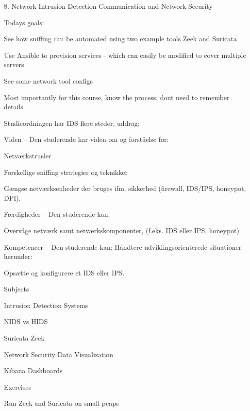 \documentclass[Screen16to9,17pt]{foils}
\begin{document}
\mytitlepage
{8. Network Intrusion Detection}
{Communication and Network Security \the\year}



Todays goals:
\begin{list2}
\item See how sniffing can be automated using two example tools Zeek and Suricata
\item Use Ansible to provision services - which can easily be modified to cover multiple servers
\item See some network tool configs
\item Most importantly for this course, know the process, dont need to remember details
\end{list2}


Studieordningen har IDS flere steder, uddrag:
\begin{list1}
\item Viden -- Den studerende har viden om og forståelse for:
\begin{list2}
\item Netværkstrusler
\item Forskellige sniffing strategier og teknikker
\item Gængse netværksenheder der bruges ifm. sikkerhed (firewall, IDS/IPS, honeypot,
DPI).
\end{list2}
\vskip 5mm
\item Færdigheder -- Den studerende kan:
\begin{list2}
\item Overvåge netværk samt netværkskomponenter, (f.eks. IDS eller IPS, honeypot)
\end{list2}
\vskip 5mm
\item Kompetencer -- Den studerende kan:
Håndtere udviklingsorienterede situationer herunder:
\begin{list2}
\item Opsætte og konfigurere et IDS eller IPS.
\end{list2}
\end{list1}





\begin{list1}
\item Subjects
\begin{list2}
\item Intrusion Detection Systems
\item NIDS vs HIDS
\item Suricata Zeek
\item Network Security Data Visualization
\item Kibana Dashboards
\end{list2}
\item Exercises
\begin{list2}
\item Run Zeek and Suricata on small pcaps
\end{list2}
\end{list1}
\end{document}

